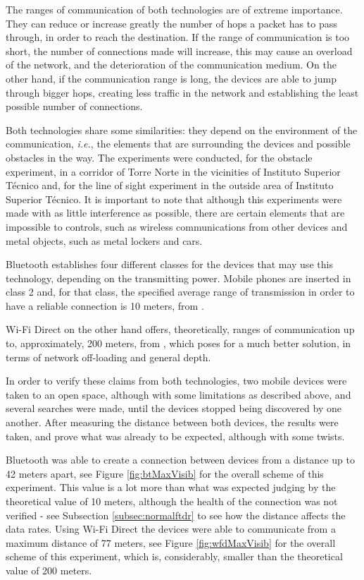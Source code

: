 The ranges of communication of both technologies are of extreme importance. They can reduce or increase greatly the number of hops a packet has to pass through, in order to reach the destination. If the range of communication is too short, the number of connections made will increase, this may cause an overload of the network, and the deterioration of the communication medium. On the other hand, if the communication range is long, the devices are able to jump through bigger hops, creating less traffic in the network and establishing the least possible number of connections.

Both technologies share some similarities: they depend on the environment of the communication, \textit{i.e.}, the elements that are surrounding the devices and possible obstacles in the way. The experiments were conducted, for the obstacle experiment, in a corridor of Torre Norte in the vicinities of Instituto Superior Técnico and, for the line of sight experiment in the outside area of Instituto Superior Técnico. It is important to note that although this experiments were made with as little interference as possible, there are certain elements that are impossible to controls, such as wireless communications from other devices and metal objects, such as metal lockers and cars.

Bluetooth establishes four different classes for the devices that may use this technology, depending on the transmitting power. Mobile phones are inserted in class 2 and, for that class, the specified average range of transmission in order to have a reliable connection is 10 meters, from \cite{bluetooth}.

Wi-Fi Direct on the other hand offers, theoretically, ranges of communication up to, approximately, 200 meters, from \cite{wfdrange}, which poses for a much better solution, in terms of network off-loading and general depth.

In order to verify these claims from both technologies, two mobile devices were taken to an open space, although with some limitations as described above, and several searches were made, until the devices stopped being discovered by one another. After measuring the distance between both devices, the results were taken, and prove what was already to be expected, although with some twists. 

Bluetooth was able to create a connection between devices from a distance up to 42 meters apart, see Figure \ref{fig:btMaxVisib} for the overall scheme of this experiment. This value is a lot more than what was expected judging by the theoretical value of 10 meters, although the health of the connection was not verified - see Subsection \ref{subsec:normalftdr} to see how the distance affects the data rates. Using Wi-Fi Direct the devices were able to communicate from a maximum distance of 77 meters, see Figure \ref{fig:wfdMaxVisib} for the overall scheme of this experiment, which is, considerably, smaller than the theoretical value of 200 meters.

